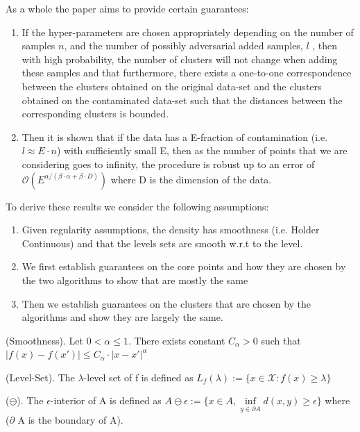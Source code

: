   
  As a whole the paper aims to provide certain guarantees:
  \begin{enumerate}
      \item If the hyper-parameters are chosen appropriately depending on the number of samples $n$, and the number of possibly adversarial added samples, $l$ , then with high probability, the number of clusters will not change when adding these samples and that furthermore, there exists a one-to-one correspondence between the clusters obtained on the original data-set and the clusters obtained on the contaminated data-set such that the distances between the corresponding clusters is bounded. 
      \item Then it is shown that if the data has a E-fraction of contamination (i.e. $l \approx E \cdot n$) with sufficiently small E, then as the number of points that we are considering goes to infinity, the procedure is robust up to an error of $\mathcal{O}(E^{\alpha/(\beta\cdot\alpha+\beta\cdot D)})$  where D is the dimension of the data.
  \end{enumerate}
  
  To derive these results we consider the following assumptions:
  
  \begin{enumerate}
      \item Given regularity assumptions, the density has smoothness (i.e. Holder Continuous) and that the levels sets are smooth w.r.t to the level.
      \item We first establish guarantees on the core points and how they are chosen by the two algorithms to show that are mostly the same
      \item Then we establish guarantees on the clusters that are chosen by the algorithms and show they are largely the same.
  \end{enumerate}

\begin{remark} (Smoothness).
Let $0<\alpha\leq 1$. There exists constant $C_{\alpha}>0$ such that $|f(x)-f(x')|\leq C_{\alpha}\cdot|x-x'|^{\alpha}$
\end{remark}

\begin{remark} (Level-Set).
The $\lambda$-level set of f is defined as $L_f(\lambda) := \{ x \in \mathcal{X}: f(x)\geq \lambda \}$
\end{remark}

\begin{remark} ($\ominus$).
The $\epsilon$-interior of A is defined as $A \ominus \epsilon := \{ x \in A, \inf\limits_{y \in \partial A}d(x,y)\geq \epsilon \}$ where ($\partial$ A is the boundary of A).
\end{remark}

